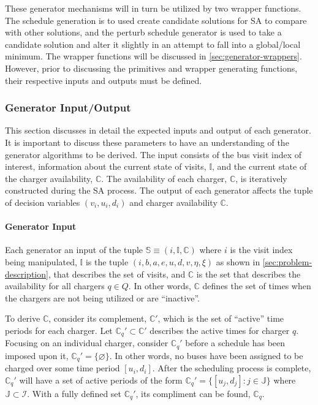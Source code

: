 \documentclass[11pt,a4paper,final]{article}
\newcommand{\visit}{(i, b, a, e, u, d, v, \eta, \xi)}
\newcommand{\I}{\mathbb{I}}                 %
\newcommand{\C}{\mathbb{C}}                 %
\newcommand{\Sol}{\mathbb{S}}               %
\newcommand{\Qset}{Q}                       %
\newcommand{\Jsetq}{\mathbb{J}}             %
\begin{document}
These generator mechanisms will in turn be utilized by two wrapper functions. The schedule generation is to used create
candidate solutions for SA to compare with other solutions, and the perturb schedule generator is used to take a
candidate solution and alter it slightly in an attempt to fall into a global/local minimum. The wrapper functions will
be discussed in \ref{sec:generator-wrappers}. However, prior to discussing the primitives and wrapper generating functions,
their respective inputs and outputs must be defined.

\subsubsection{Generator Input/Output}
\label{sec:generator-input-output}
This section discusses in detail the expected inputs and output of each generator. It is important to discuss these
parameters to have an understanding of the generator algorithms to be derived. The input consists of the bus visit index
of interest, information about the current state of visits, \(\I\), and the current state of the charger availability,
\(\C\). The availability of each charger, \(\C\), is iteratively constructed during the SA process. The output of each
generator affects the tuple of decision variables \((v_i, u_i, d_i)\) and charger availability \(\C\).

\paragraph{Generator Input}
\label{sec:org31fc31f}
Each generator an input of the tuple \(\Sol \equiv (i, \I, \C)\) where \(i\) is the visit index being manipulated, \(\I\) is the
tuple \(\visit\) as shown in \ref{sec:problem-description}, that describes the set of visits, and \(\C\) is the set that
describes the availability for all chargers \(q \in \Qset\). In other words, \(\C\) defines the set of times when the chargers
are not being utilized or are ``inactive''.

To derive \(\C\), consider its complement, \(\C'\), which is the set of ``active'' time periods for each charger. Let \(\C_q' \subset
\C'\) describes the active times for charger \(q\). Focusing on an individual charger, consider \(\C_q'\) before a schedule
has been imposed upon it, \(\C_q' = \{ \varnothing \}\). In other words, no buses have been assigned to be charged over
some time period \([u_i, d_i]\). After the scheduling process is complete, \(\C_q'\) will have a set of active periods of
the form \(\C_q' = \{[u_j, d_j]: j \in \Jsetq \}\) where \(\Jsetq \subset \mathcal{I}\). With a fully defined set \(\C_q'\), its compliment can
be found, \(\C_q\).
\end{document}
